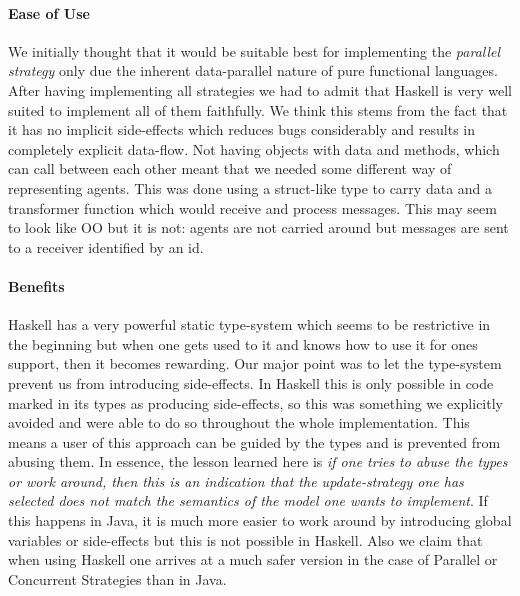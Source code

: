 \paragraph{Ease of Use}
We initially thought that it would be suitable best for implementing the \textit{parallel strategy} only due the inherent data-parallel nature of pure functional languages. After having implementing all strategies we had to admit that Haskell is very well suited to implement all of them faithfully. We think this stems from the fact that it has no implicit side-effects which reduces bugs considerably and results in completely explicit data-flow. 
Not having objects with data and methods, which can call between each other meant that we needed some different way of representing agents. This was done using a struct-like type to carry data and a transformer function which would receive and process messages. This may seem to look like OO but it is not: agents are not carried around but messages are sent to a receiver identified by an id.

\paragraph{Benefits}
Haskell has a very powerful static type-system which seems to be restrictive in the beginning but when one gets used to it and knows how to use it for ones support, then it becomes rewarding. Our major point was to let the type-system prevent us from introducing side-effects. In Haskell this is only possible in code marked in its types as producing side-effects, so this was something we explicitly avoided and were able to do so throughout the whole implementation. This means a user of this approach can be guided by the types and is prevented from abusing them. In essence, the lesson learned here is \textit{if one tries to abuse the types or work around, then this is an indication that the update-strategy one has selected does not match the semantics of the model one wants to implement}. If this happens in Java, it is much more easier to work around by introducing global variables or side-effects but this is not possible in Haskell. Also we claim that when using Haskell one arrives at a much safer version in the case of Parallel or Concurrent Strategies than in Java.

